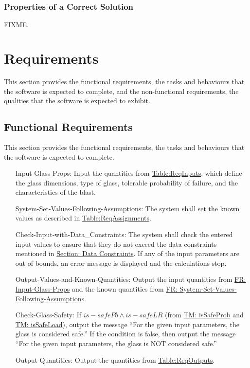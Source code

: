 \documentclass[12pt]{article}
\begin{document}
\subsubsection{Properties of a Correct Solution}
\label{Sec:CorSolProps}
FIXME.
\section{Requirements}
\label{Sec:Requirements}
This section provides the functional requirements, the tasks and behaviours that the software is expected to complete, and the non-functional requirements, the qualities that the software is expected to exhibit.
\subsection{Functional Requirements}
\label{Sec:FRs}
This section provides the functional requirements, the tasks and behaviours that the software is expected to complete.
\begin{itemize}
\item[Input-Glass-Props:\phantomsection\label{inputGlassProps}]Input the quantities from \hyperref[Table:ReqInputs]{Table:ReqInputs}, which define the glass dimensions, type of glass, tolerable probability of failure, and the characteristics of the blast.
\item[System-Set-Values-Following-Assumptions:\phantomsection\label{sysSetValsFollowingAssumps}]The system shall set the known values as described in \hyperref[Table:ReqAssignments]{Table:ReqAssignments}.
\item[Check-Input-with-Data\_Constraints:\phantomsection\label{checkInputWithDataCons}]The system shall check the entered input values to ensure that they do not exceed the data constraints mentioned in \hyperref[Sec:DataConstraints]{Section: Data Constraints}. If any of the input parameters are out of bounds, an error message is displayed and the calculations stop.
\item[Output-Values-and-Known-Quantities:\phantomsection\label{outputValsAndKnownQuants}]Output the input quantities from \hyperref[inputGlassProps]{FR: Input-Glass-Props} and the known quantities from \hyperref[sysSetValsFollowingAssumps]{FR: System-Set-Values-Following-Assumptions}.
\item[Check-Glass-Safety:\phantomsection\label{checkGlassSafety}]If $is-safePb\land{}is-safeLR$ (from \hyperref[TM:isSafeProb]{TM: isSafeProb} and \hyperref[TM:isSafeLoad]{TM: isSafeLoad}), output the message ``For the given input parameters, the glass is considered safe.'' If the condition is false, then output the message ``For the given input parameters, the glass is NOT considered safe.''
\item[Output-Quantities:\phantomsection\label{outputQuants}]Output the quantities from \hyperref[Table:ReqOutputs]{Table:ReqOutputs}.
\end{itemize}
\end{document}
